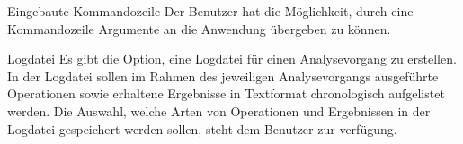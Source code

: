  Eingebaute Kommandozeile
\newline
Der Benutzer hat die Möglichkeit, durch eine Kommandozeile Argumente an die Anwendung übergeben zu können.

 Logdatei
\newline
Es gibt die Option, eine Logdatei für einen Analysevorgang zu erstellen. In der Logdatei sollen im Rahmen des jeweiligen Analysevorgangs ausgeführte Operationen sowie erhaltene Ergebnisse in Textformat chronologisch aufgelistet werden. Die Auswahl, welche Arten von Operationen und Ergebnissen in der Logdatei gespeichert werden sollen, steht dem Benutzer zur verfügung.
